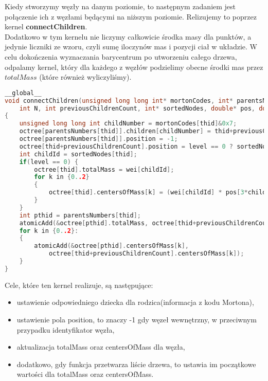 \documentclass[14pt,twoside,a4paper]{article}
\theoremstyle{definition}
\begin{document}
Kiedy stworzymy węzły na danym poziomie, to następnym zadaniem jest połączenie ich z węzłami będącymi na niższym poziomie. Relizujemy to poprzez kernel \textbf{connectChildren}.\\
\bigskip
Dodatkowo w tym kernelu nie liczymy całkowicie środka masy dla punktów, a jedynie liczniki ze wzoru, czyli sumę iloczynów mas i pozycji ciał w układzie. W celu dokończenia wyznaczania barycentrum po utworzeniu całego drzewa, odpalamy kernel, który dla każdego z węzłów podzielimy obecne środki mas przez $totalMass$ (które również wyliczyliśmy).
\bigskip
{}              
\begin{lstlisting}[language=C++, frame=single, framerule=2pt, caption=Kernel connectChildren]
__global__
void connectChildren(unsigned long long int* mortonCodes, int* parentsNumbers, OctreeNode* octree, 
    int N, int previousChildrenCount, int* sortedNodes, double* pos, double* wei, int level) 
{
    unsigned long long int childNumber = mortonCodes[thid]&0x7; 
    octree[parentsNumbers[thid]].children[childNumber] = thid+previousChildrenCount;
    octree[parentsNumbers[thid]].position = -1;
    octree[thid+previousChildrenCount].position = level == 0 ? sortedNodes[thid] : -1;
    int childId = sortedNodes[thid];
    if(level == 0) {
        octree[thid].totalMass = wei[childId];
        for k in {0..2} 
        {
            octree[thid].centersOfMass[k] = (wei[childId] * pos[3*childId + k]) / wei[childId];
        }
    }
    int pthid = parentsNumbers[thid];
    atomicAdd(&octree[pthid].totalMass, octree[thid+previousChildrenCount].totalMass);
    for k in {0..2}:
    {
    	atomicAdd(&octree[pthid].centersOfMass[k], 
    		octree[thid+previousChildrenCount].centersOfMass[k]);
    }
}
\end{lstlisting}

Cele, które ten kernel realizuje, są następujące:
\begin{itemize}
\item ustawienie odpowiedniego dziecka dla rodzica(informacja z kodu Mortona),
\item ustawienie pola position, to znaczy -1 gdy węzeł wewnętrzny, w przeciwnym przypadku identyfikator węzła,
\item aktualizacja totalMass oraz centersOfMass dla węzła,
\item dodatkowo, gdy funkcja przetwarza liście drzewa, to ustawia im początkowe wartości dla totalMass oraz centersOfMass.
\end{itemize}
\end{document}
